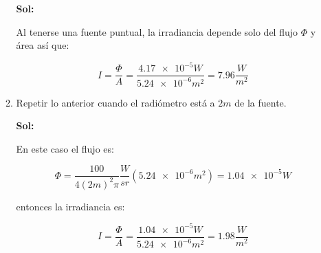 \documentclass[12pt,a4paper]{article}
\begin{document}
\begin{enumerate}
\begin{enumerate}
    \textbf{Sol:}
    
    Al tenerse una fuente puntual, la irradiancia depende solo del flujo $\Phi$ y área así que:
    
    \begin{equation*}
        I = \frac{\Phi}{A} = \frac{\num{4.17e-5}W}{\num{5.24 e-6}m^2} = 7.96 \frac{W}{m^2}
    \end{equation*}
    
    \item Repetir lo anterior cuando el radiómetro está a $2 m$ de la fuente.
    
    \textbf{Sol:} 
    
    En este caso el flujo es:
    
    \begin{equation*}
        \Phi = \frac{100}{4 (2m)^2 \pi} \frac{W}{sr} (\num{5.24e-6} m^2) = \num{1.04e-5} W 
    \end{equation*}
    
    entonces la irradiancia es:
    
    \begin{equation*}
        I = \frac{\Phi}{A} = \frac{\num{1.04e-5}W}{\num{5.24 e-6}m^2} = 1.98 \frac{W}{m^2} 
    \end{equation*}
\end{enumerate}

    
    
\end{enumerate}
\end{document}
